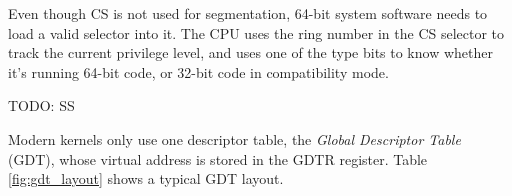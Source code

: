 Even though CS is not used for segmentation, 64-bit system software needs to
load a valid selector into it. The CPU uses the ring number in the CS selector
to track the current privilege level, and uses one of the type bits to know
whether it's running 64-bit code, or 32-bit code in compatibility mode.

TODO: SS



Modern kernels only use one descriptor table, the \textit{Global Descriptor
Table} (GDT), whose virtual address is stored in the GDTR register. Table~
\ref{fig:gdt_layout} shows a typical GDT layout.

\begin{table}[hbt]
  \caption{
    A typical GDT layout in the 64-bit Intel Architecture.
  }
  \label{fig:gdt_layout}
\end{table}

